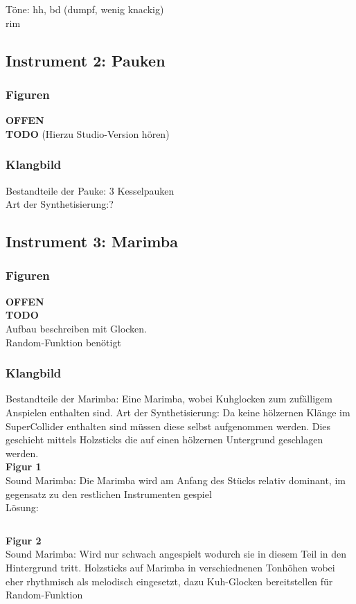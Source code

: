 \documentclass[
10pt, %
a4paper, %
oneside, %
headinclude,footinclude, %
BCOR5mm, %
]{scrartcl}
\begin{document}
Töne: hh, bd (dumpf, wenig knackig)\\
rim

\subsection{Instrument 2: Pauken}
\subsubsection{Figuren}
{\color{red}\textbf{OFFEN}} \\
{\color{red}\textbf{TODO}}
(Hierzu Studio-Version hören)\\

\subsubsection{Klangbild}
Bestandteile der Pauke: 3 Kesselpauken\\
Art der Synthetisierung:?\\


\subsection{Instrument 3: Marimba}
\subsubsection{Figuren}
{\color{red}\textbf{OFFEN}} \\
{\color{red}\textbf{TODO}}\\
Aufbau beschreiben mit Glocken.\\
Random-Funktion benötigt

\subsubsection{Klangbild}
Bestandteile der Marimba: Eine Marimba, wobei Kuhglocken zum zufälligem Anspielen enthalten sind.
Art der Synthetisierung: Da keine hölzernen Klänge im SuperCollider enthalten sind müssen diese selbst aufgenommen werden. Dies geschieht mittels 
Holzsticks die auf einen hölzernen Untergrund geschlagen werden.\\
\noindent \textbf{Figur 1}\\
Sound Marimba: Die Marimba wird am Anfang des Stücks relativ dominant, im gegensatz zu den restlichen Instrumenten gespiel\\
Lösung:\\
\begin{lstlisting}

\end{lstlisting}
\noindent \textbf{Figur 2}\\
Sound Marimba: Wird nur schwach angespielt wodurch sie in diesem Teil in den Hintergrund tritt.
Holzsticks auf Marimba in verschiednenen Tonhöhen wobei eher rhythmisch als melodisch eingesetzt, dazu Kuh-Glocken bereitstellen für Random-Funktion
\end{document}
